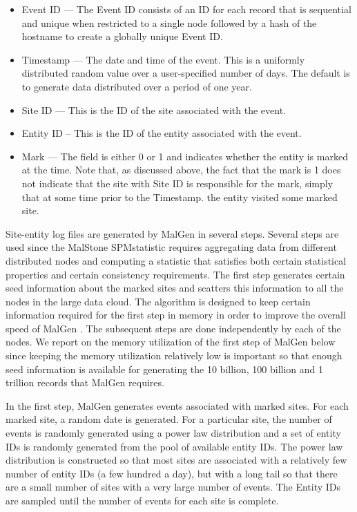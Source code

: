 \documentclass{acm_proc_article-sp}
\def\spm{\mbox{SPM}}
\def\malstone{MalStone } \def\malgen{MalGen }
\begin{document}
\begin{itemize}
\item Event ID ---  The Event ID consists of an ID for each record that is sequential and unique when restricted to a single node followed by a hash of the hostname to create a globally unique Event  ID.

\item Timestamp --- The date and time of the event. This is a
  uniformly distributed random value over a user-specified number of
  days.  The default is to generate data distributed over a period of
  one year.

\item Site ID --- This is the ID of the site associated with the event. 

\item Entity ID -- This is the ID of the entity associated with the  event.

\item Mark --- The field is either 0 or 1 and indicates whether
the entity is marked at the time.  Note that, as discussed above, the fact that the mark is 1 does 
not indicate that the site with Site ID is responsible for the mark, simply that at some time
prior to the Timestamp. the entity visited some marked site.

\end{itemize}




Site-entity log files are generated by \malgen in several steps. 
Several steps are used since the \malstone \spm statistic
requires aggregating data from different distributed nodes and
computing a statistic that satisfies both certain statistical properties
and certain consistency requirements.  The
first step generates certain seed information about the marked sites and scatters
this information to all the nodes in the large data cloud.   The
algorithm is designed to keep certain information required for the
first step  in memory in order to improve the overall speed of \malgen.  
The subsequent steps are done independently by each of the nodes.
We report on the memory utilization of the first step of \malgen below since keeping
the memory utilization relatively low is important so that enough seed
information is available for generating the 10 billion, 100 billion
and 1 trillion records that \malgen requires.

In the first step, \malgen generates events associated with marked sites.
For each marked site, a random date is generated. 
For a particular site, the number of events is randomly
generated using a power law distribution and a set of entity IDs is
randomly generated from the pool of available entity IDs. The power
law distribution is constructed so that most sites are associated with
a relatively few number of entity IDs (a few hundred a day), but with
a long tail so that there are a small number of sites with a very
large number of events.  The Entity IDs are sampled until the
number of events for each site is complete.
\end{document}
